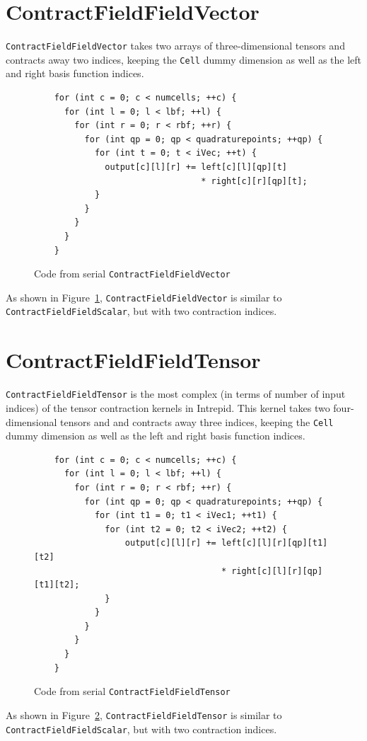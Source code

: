 \section{ContractFieldFieldVector}
\texttt{ContractFieldFieldVector} takes two arrays of three-dimensional tensors
and contracts away two indices, keeping the \texttt{Cell} dummy dimension as
well as the left and right basis function indices.

\begin{figure}[ht]
    \begin{lstlisting}
    for (int c = 0; c < numcells; ++c) {
      for (int l = 0; l < lbf; ++l) {
        for (int r = 0; r < rbf; ++r) {
          for (int qp = 0; qp < quadraturepoints; ++qp) {
            for (int t = 0; t < iVec; ++t) {
              output[c][l][r] += left[c][l][qp][t] 
                                 * right[c][r][qp][t];
            }
          }
        }
      }
    }
    \end{lstlisting}
\caption{Code from serial \texttt{ContractFieldFieldVector}
\label{lst:ContractFieldFieldVectorSerial}} 
\end{figure}

As shown in Figure~\ref{lst:ContractFieldFieldVectorSerial},
\texttt{ContractFieldFieldVector} is similar to
\texttt{ContractFieldFieldScalar}, but with two contraction indices.

\section{ContractFieldFieldTensor}
\texttt{ContractFieldFieldTensor} is the most complex (in terms of number of 
input indices) of the tensor contraction
kernels in Intrepid. This kernel takes two four-dimensional tensors and
and contracts away three indices, keeping the \texttt{Cell} dummy dimension as
well as the left and right basis function indices.

\begin{figure}[ht]
    \begin{lstlisting}
    for (int c = 0; c < numcells; ++c) {
      for (int l = 0; l < lbf; ++l) {
        for (int r = 0; r < rbf; ++r) {
          for (int qp = 0; qp < quadraturepoints; ++qp) {
            for (int t1 = 0; t1 < iVec1; ++t1) {
              for (int t2 = 0; t2 < iVec2; ++t2) {
                  output[c][l][r] += left[c][l][r][qp][t1][t2] 
                                     * right[c][l][r][qp][t1][t2];
              }
            }
          }
        }
      }
    }
    \end{lstlisting}
\caption{Code from serial \texttt{ContractFieldFieldTensor}
\label{lst:ContractFieldFieldTensorSerial}} 
\end{figure}

As shown in Figure~\ref{lst:ContractFieldFieldTensorSerial},
\texttt{ContractFieldFieldTensor} is similar to
\texttt{ContractFieldFieldScalar}, but with two contraction indices.

